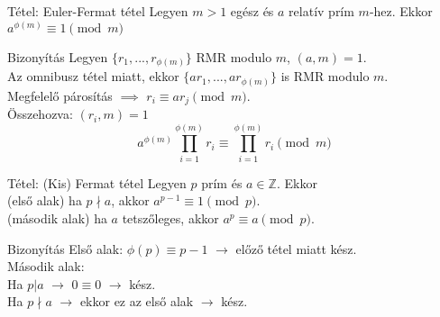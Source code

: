 \documentclass{beamer}
\begin{document}
\begin{frame}

\begin{block}{Tétel: Euler-Fermat tétel}
Legyen $m > 1$ egész és $a$ relatív prím $m$-hez. Ekkor $a^{{\phi}(m)} \equiv 1 \pmod{m}$
\end{block}

\begin{block}{Bizonyítás}
Legyen $\{ r_1, ..., r_{{\phi}(m)}\}$ RMR modulo $m$, $(a, m) = 1$.\\
Az omnibusz tétel miatt, ekkor $\{ ar_1, ..., ar_{{\phi}(m)}\}$ is RMR modulo $m$.\\
Megfelelő párosítás $\implies$ $r_i \equiv ar_j \pmod{m}$.\\
Összehozva: $(r_i, m) = 1$\\
\smallskip
$$a^{{\phi}(m)} \prod^{{\phi}(m)}_{i=1} r_i \equiv \prod^{{\phi}(m)}_{i=1} r_i \pmod{m}$$

\end{block}

\end{frame}

\begin{frame}

\begin{block}{Tétel: (Kis) Fermat tétel}
Legyen $p$ prím és $a \in \mathbb{Z}$. Ekkor\\
(első alak) ha $p \nmid a$, akkor $a^{p-1} \equiv 1 \pmod{p}$.\\
(második alak) ha $a$ tetszőleges, akkor $a^p \equiv a \pmod{p}$.

\end{block}

\begin{block}{Bizonyítás}
Első alak: ${\phi}(p) \equiv p - 1$ $\rightarrow$ előző tétel miatt kész.\\
\bigskip
Második alak:\\
Ha $p|a$ $\rightarrow$ $0 \equiv 0$ $\rightarrow$ kész.\\
Ha $p{\nmid}a$ $\rightarrow$ ekkor ez az első alak $\rightarrow$ kész.

\end{block}

\end{frame}
\end{document}
